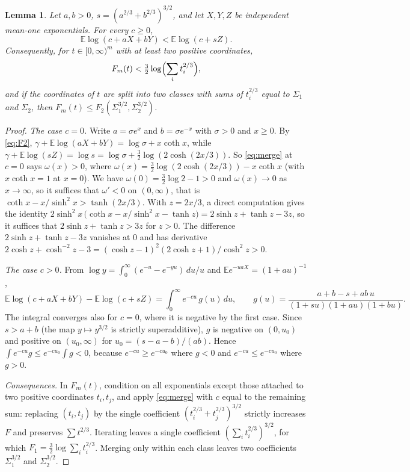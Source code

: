 \documentclass[11pt,a4paper]{article}
\newtheorem{lemma}[theorem]{Lemma}
\theoremstyle{remark}
\newcommand{\E}{\mathbb E}
\begin{document}
\begin{lemma}\label{lem:merge}
Let $a,b>0$, $s=(a^{2/3}+b^{2/3})^{3/2}$, and let $X,Y,Z$ be independent mean-one exponentials. For every $c\ge0$,
\begin{equation}\label{eq:merge}
 \E\log(c+aX+bY)<\E\log(c+sZ).
\end{equation}
Consequently, for $t\in[0,\infty)^m$ with at least two positive coordinates,
\[
 F_m(t)<\tfrac32\log\Bigl(\sum_it_i^{2/3}\Bigr),
\]
and if the coordinates of $t$ are split into two classes with sums of $t_i^{2/3}$ equal to $\Sigma_1$ and $\Sigma_2$, then $F_m(t)\le F_2(\Sigma_1^{3/2},\Sigma_2^{3/2})$.
\end{lemma}
\begin{proof}
\emph{The case $c=0$.} Write $a=\sigma e^x$ and $b=\sigma e^{-x}$ with $\sigma>0$ and $x\ge0$. By \eqref{eq:F2}, $\gamma+\E\log(aX+bY)=\log\sigma+x\coth x$, while $\gamma+\E\log(sZ)=\log s=\log\sigma+\frac32\log(2\cosh(2x/3))$. So \eqref{eq:merge} at $c=0$ says $\omega(x)>0$, where $\omega(x)=\frac32\log(2\cosh(2x/3))-x\coth x$ (with $x\coth x=1$ at $x=0$). We have $\omega(0)=\frac32\log2-1>0$ and $\omega(x)\to0$ as $x\to\infty$, so it suffices that $\omega'<0$ on $(0,\infty)$, that is $\coth x-x/\sinh^2x>\tanh(2x/3)$. With $z=2x/3$, a direct computation gives the identity $2\sinh^2x\,\bigl(\coth x-x/\sinh^2x-\tanh z\bigr)=2\sinh z+\tanh z-3z$, so it suffices that $2\sinh z+\tanh z>3z$ for $z>0$. The difference $2\sinh z+\tanh z-3z$ vanishes at $0$ and has derivative $2\cosh z+\cosh^{-2}z-3=(\cosh z-1)^2(2\cosh z+1)/\cosh^2z>0$.

\emph{The case $c>0$.} From $\log y=\int_0^\infty(e^{-u}-e^{-yu})\,du/u$ and $\E e^{-uaX}=(1+au)^{-1}$,
\[
 \E\log(c+aX+bY)-\E\log(c+sZ)=\int_0^\infty e^{-cu}\,g(u)\,du,\qquad
 g(u)=\frac{a+b-s+ab\,u}{(1+su)(1+au)(1+bu)}.
\]
The integral converges also for $c=0$, where it is negative by the first case. Since $s>a+b$ (the map $y\mapsto y^{3/2}$ is strictly superadditive), $g$ is negative on $(0,u_0)$ and positive on $(u_0,\infty)$ for $u_0=(s-a-b)/(ab)$. Hence $\int e^{-cu}g\le e^{-cu_0}\int g<0$, because $e^{-cu}\ge e^{-cu_0}$ where $g<0$ and $e^{-cu}\le e^{-cu_0}$ where $g>0$.

\emph{Consequences.} In $F_m(t)$, condition on all exponentials except those attached to two positive coordinates $t_i,t_j$, and apply \eqref{eq:merge} with $c$ equal to the remaining sum: replacing $(t_i,t_j)$ by the single coefficient $(t_i^{2/3}+t_j^{2/3})^{3/2}$ strictly increases $F$ and preserves $\sum t^{2/3}$. Iterating leaves a single coefficient $(\sum_it_i^{2/3})^{3/2}$, for which $F_1=\frac32\log\sum_it_i^{2/3}$. Merging only within each class leaves two coefficients $\Sigma_1^{3/2}$ and $\Sigma_2^{3/2}$.
\end{proof}
\end{document}
